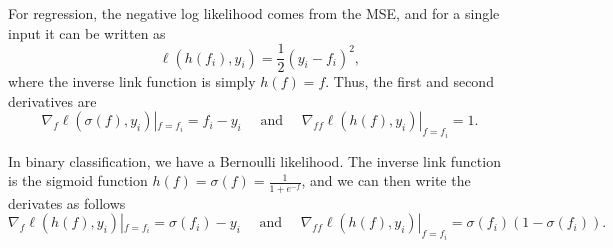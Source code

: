 \documentclass{article} %
\newcommand{\Norm}{\mathcal{N}}
\begin{document}
For regression, the negative log likelihood comes from the MSE, and for a single input it can be written as
\begin{equation}
	\ell(h(f_i), y_i) = \frac{1}{2} (y_i -f_i)^2,%
\end{equation}
where the inverse link function is simply $h(f) = f$. Thus, the first and second derivatives are
\begin{equation}
	\nabla_f \ell(\sigma(f), y_i)|_{f=f_i} =  f_i - y_i \quad \text{ and } \quad  \nabla_{f\!f} \ell(h(f), y_i)|_{f=f_i} = 1.
\end{equation}

In binary classification, we have a Bernoulli likelihood. The inverse link function is the sigmoid function $h(f) = \sigma(f) = \frac{1}{1 + e^{-f}}$, and we can then write the derivates as follows
\begin{equation}
	\nabla_f \ell(h(f), y_i)|_{f=f_i} = \sigma(f_i) - y_i  \quad \text{ and } \quad  \nabla_{f\!f} \ell(h(f), y_i)|_{f=f_i} = \sigma(f_i) (1 - \sigma(f_i)).
\end{equation}
\end{document}
